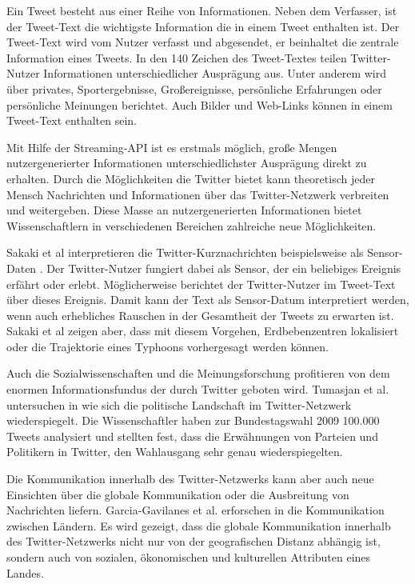 		Ein Tweet besteht aus einer Reihe von Informationen.
		Neben dem Verfasser, ist der Tweet-Text die wichtigste Information die in einem Tweet enthalten ist.  
		Der Tweet-Text wird vom Nutzer verfasst und abgesendet, er beinhaltet die zentrale Information eines Tweets. 
		In den 140 Zeichen des Tweet-Textes teilen Twitter-Nutzer Informationen unterschiedlicher Ausprägung aus.
		Unter anderem wird über privates, Sportergebnisse, Großereignisse, persönliche Erfahrungen oder persönliche Meinungen berichtet. 
		Auch Bilder und Web-Links können in einem Tweet-Text enthalten sein. 

		Mit Hilfe der Streaming-API ist es erstmals möglich, große Mengen nutzergenerierter Informationen unterschiedlichster Ausprägung direkt zu erhalten. 
		Durch die Möglichkeiten die Twitter bietet kann theoretisch jeder Mensch Nachrichten und Informationen über das Twitter-Netzwerk verbreiten und weitergeben. 
		Diese Masse an nutzergenerierten Informationen bietet Wissenschaftlern in verschiedenen Bereichen zahlreiche neue Möglichkeiten.

		Sakaki et al interpretieren die Twitter-Kurznachrichten beispielsweise als Sensor-Daten \cite{Sakaki2010}.
		Der Twitter-Nutzer fungiert dabei als Sensor, der ein beliebiges Ereignis erfährt oder erlebt.
		Möglicherweise berichtet der Twitter-Nutzer im Tweet-Text über dieses Ereignis. 
		Damit kann der Text als Sensor-Datum interpretiert werden, wenn auch erhebliches Rauschen in der Gesamtheit der Tweets zu erwarten ist.    
		Sakaki et al zeigen aber, dass mit diesem Vorgehen, Erdbebenzentren lokalisiert oder die Trajektorie eines Typhoons vorhergesagt werden können.   
		
		Auch die Sozialwissenschaften und die Meinungsforschung profitieren von dem enormen Informationsfundus der durch Twitter geboten wird.  
		Tumasjan et al. untersuchen in \cite{Tumasjan2011} wie sich die politische Landschaft im Twitter-Netzwerk wiederspiegelt. 
		Die Wissenschaftler haben zur Bundestagswahl 2009 100.000 Tweets analysiert und stellten fest, dass die Erwähnungen von Parteien und Politikern in Twitter, den Wahlausgang sehr genau wiederspiegelten.  
		
		Die Kommunikation innerhalb des Twitter-Netzwerks kann aber auch neue Einsichten über die globale Kommunikation oder die Ausbreitung von Nachrichten liefern.
		Garcia-Gavilanes et al. erforschen in \cite{Garcia-Gavilanes2014} die Kommunikation zwischen Ländern. 
		Es wird gezeigt, dass die globale Kommunikation innerhalb des Twitter-Netzwerks nicht nur von der geografischen Distanz abhängig ist, sondern auch von sozialen, ökonomischen und kulturellen Attributen eines Landes.   

